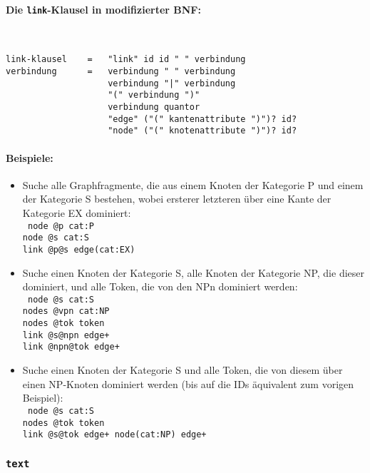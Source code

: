 \documentclass[12pt]{scrartcl}
\begin{document}
\paragraph*{Die \texttt{link}-Klausel in modifizierter BNF:}
~
\begin{framed}
\begin{lstlisting}
link-klausel    =   "link" id id " " verbindung
verbindung      =   verbindung " " verbindung
                    verbindung "|" verbindung
                    "(" verbindung ")"
                    verbindung quantor
                    "edge" ("(" kantenattribute ")")? id?
                    "node" ("(" knotenattribute ")")? id?
\end{lstlisting}
\end{framed}


\paragraph*{Beispiele:}
\begin{itemize}
	\item Suche alle Graphfragmente, die aus einem Knoten der Kategorie P und einem der Kategorie S bestehen, wobei ersterer letzteren über eine Kante der Kategorie EX dominiert:\\
	{\tt
	node @p cat:P\\[-.4ex]
	node @s cat:S\\[-.4ex]
	link @p@s edge(cat:EX)
	}
	\item Suche einen Knoten der Kategorie S, alle Knoten der Kategorie NP, die dieser dominiert, und alle Token, die von den NPn dominiert werden:\\
	{\tt
	node @s cat:S\\[-.4ex]
	nodes @vpn cat:NP\\[-.4ex]
	nodes @tok token\\[-.4ex]
	link @s@npn edge+\\[-.4ex]
	link @npn@tok edge+
	}
	\item Suche einen Knoten der Kategorie S und alle Token, die von diesem über einen NP-Knoten dominiert werden (bis auf die IDs äquivalent zum vorigen Beispiel):\\
	{\tt
	node @s cat:S\\[-.4ex]
	nodes @tok token\\[-.4ex]
	link @s@tok edge+ node(cat:NP) edge+
	}
\end{itemize}




\subsubsection{\texttt{text}}
\end{document}
